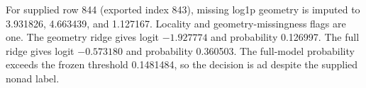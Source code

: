 For supplied row 844 (exported index 843), missing log1p geometry is imputed to 3.931826, 4.663439, and 1.127167. Locality and geometry-missingness flags are one. The geometry ridge gives logit $-1.927774$ and probability 0.126997. The full ridge gives logit $-0.573180$ and probability 0.360503. The full-model probability exceeds the frozen threshold 0.1481484, so the decision is ad despite the supplied nonad label.
